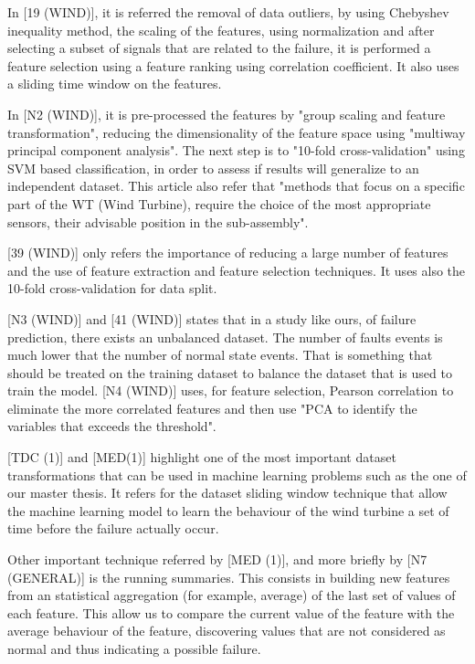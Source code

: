 In [19 (WIND)], it is referred the removal of data outliers, by using Chebyshev inequality method, the scaling of the features, using normalization and after selecting a subset of signals that are related to the failure, it is performed a feature selection using a feature ranking using correlation coefficient. It also uses a sliding time window on the features.

In [N2 (WIND)], it is pre-processed the features by "group scaling and feature transformation", reducing the dimensionality of the feature space using "multiway principal component analysis". The next step is to "10-fold cross-validation" using SVM based classification, in order to assess if results will generalize to an independent dataset. This article also refer that "methods that focus on a specific part of the WT (Wind Turbine), require the choice of the most appropriate sensors, their advisable position in the sub-assembly".

[39 (WIND)] only refers the importance of reducing a large number of features and the use of feature extraction and feature selection techniques. It uses also the 10-fold cross-validation for data split.

[N3 (WIND)] and [41 (WIND)] states that in a study like ours, of failure prediction, there exists an unbalanced dataset. The number of faults events is much lower that the number of normal state events. That is something that should be treated on the training dataset to balance the dataset that is used to train the model.
[N4 (WIND)] uses, for feature selection, Pearson correlation to eliminate the more correlated features and then use "PCA to identify the variables that exceeds the threshold".

[TDC (1)] and [MED(1)] highlight one of the most important dataset transformations that can be used in machine learning problems such as the one of our master thesis. It refers for the dataset sliding window technique that allow the machine learning model to learn the behaviour of the wind turbine a set of time before the failure actually occur.

Other important technique referred by [MED (1)], and more briefly by [N7 (GENERAL)] is the running summaries. This consists in building new features from an statistical aggregation (for example, average) of the last set of values of each feature. This allow us to compare the current value of the feature with the average behaviour of the feature, discovering values that are not considered as normal and thus indicating a possible failure.

